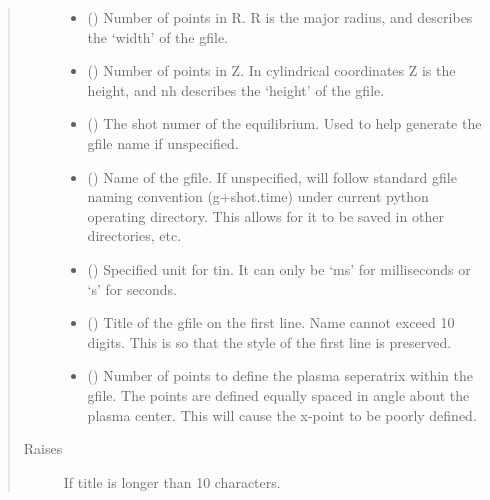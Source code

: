 \documentclass[letterpaper,10pt,english]{sphinxmanual}
\begin{document}
\begin{fulllineitems}
\begin{fulllineitems}
\begin{quote}
\begin{description}
\begin{itemize}
\item {} 
 () \textendash{} Number of points in R.
R is the major radius, and describes the ‘width’ of the
gfile.

\item {} 
 () \textendash{} Number of points in Z. In cylindrical
coordinates Z is the height, and nh describes the ‘height’
of the gfile.

\item {} 
 () \textendash{} The shot numer of the equilibrium.
Used to help generate the gfile name if unspecified.

\item {} 
 () \textendash{} Name of the gfile.  If unspecified, will follow
standard gfile naming convention (g+shot.time) under current
python operating directory.  This allows for it to be saved
in other directories, etc.

\item {} 
 () \textendash{} Specified unit for tin. It can only be ‘ms’ for
milliseconds or ‘s’ for seconds.

\item {} 
 () \textendash{} Title of the gfile on the first line. Name cannot
exceed 10 digits. This is so that the style of the first line
is preserved.

\item {} 
 () \textendash{} Number of points to define the plasma
seperatrix within the gfile.  The points are defined equally
spaced in angle about the plasma center.  This will cause the
x-point to be poorly defined.

\end{itemize}

\item[{Raises}] \leavevmode
{} \textendash{} If title is longer than 10 characters.


\end{description}
\end{quote}
\end{fulllineitems}
\end{fulllineitems}
\end{document}
